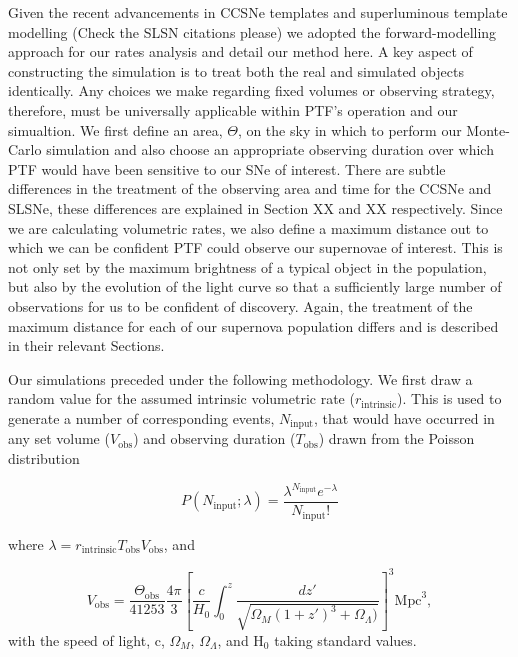 \documentclass[a4paper,fleqn,usenatbib]{mnras}
\newcommand{\chris}[1]{\color{orange}#1\color{black}}
\begin{document}
Given the recent advancements in CCSNe templates \citep{Vincenzi2019} and superluminous template modelling \citep{Angus2018,Inserra2018} \chris{(Check the SLSN citations please)} we adopted the forward-modelling approach for our rates analysis and detail our method here. A key aspect of constructing the simulation is to treat both the real and simulated objects identically. Any choices we make regarding fixed volumes or observing strategy, therefore, must be universally applicable within PTF's operation and our simualtion. We first define an area, $\Theta$, on the sky in which to perform our Monte-Carlo simulation and also choose an appropriate observing duration over which PTF would have been sensitive to our SNe of interest. There are subtle differences in the treatment of the observing area and time for the CCSNe and SLSNe, these differences are explained in Section XX and XX respectively. Since we are calculating volumetric rates, we also define a maximum distance out to which we can be confident PTF could observe our supernovae of interest. This is not only set by the maximum brightness of a typical object in the population, but also by the evolution of the light curve so that a sufficiently large number of observations for us to be confident of discovery. Again, the treatment of the maximum distance for each of our supernova population differs and is described in their relevant Sections.

Our simulations preceded under the following methodology. We first draw a random value for the assumed intrinsic volumetric rate ($r_\mathrm{intrinsic}$). This is used to generate a number of corresponding events, $N_\mathrm{input}$, that would have occurred in any set volume ($V_\mathrm{obs}$) and observing duration ($T_\mathrm{obs}$) drawn from the Poisson distribution

\begin{equation}
    \label{eqn:poiSim}
    P(N_\mathrm{input}; \lambda)=\frac{\lambda^{N_\mathrm{input}} e^{-\lambda}}{N_\mathrm{input}!}
\end{equation}

where $\lambda=r_\mathrm{intrinsic}T_\mathrm{obs}V_\mathrm{obs}$, and

\begin{equation}
V_\mathrm{obs}=\frac{\Theta_\mathrm{obs}}{41253}\frac{4\pi}{3}\left[\frac{c}{H_0} \int_{0}^{z} \frac{dz'}{\sqrt{\Omega_M(1+z')^3+\Omega_\Lambda )}}\right ]^3\textrm{Mpc}^3,
\label{eqn:volume}
\end{equation}
with the speed of light, c, $\Omega_M$, $\Omega_\Lambda$, and H$_0$ taking standard values.
\end{document}
